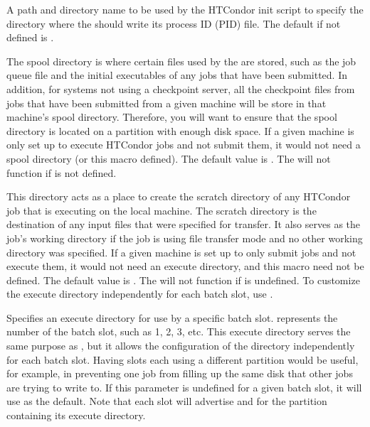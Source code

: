 \begin{description}
\label{param:Run}
\item[\Macro{RUN}]
  A path and directory name to be used by the HTCondor init script to 
  specify the directory where the  should write its process ID
  (PID) file. 
  The default if not defined is .
  
\label{param:Spool}
\item[\Macro{SPOOL}]
  The spool directory is where
  certain files used by the  are stored, such as the
  job queue file and the initial executables of any jobs that have
  been submitted.  In addition, for systems not using a checkpoint
  server, all the checkpoint files from jobs that have been submitted
  from a given machine will be store in that machine's spool
  directory.  Therefore, you will want to ensure that the spool
  directory is located on a partition with enough disk space.  If a
  given machine is only set up to execute HTCondor jobs and not submit
  them, it would not need a spool directory (or this macro defined).
  The default value is .
  The 
  will not function if  is not defined.
  
\label{param:Execute}
\item[\Macro{EXECUTE}]
  This directory acts as
  a place to create the scratch directory of any HTCondor job that is executing
  on
  the local machine.  The scratch directory is the destination of
  any input files that were specified for transfer.  It also serves
  as the job's working directory if the job is using file transfer
  mode and no other working directory was specified.
  If a given machine is set up to only submit
  jobs and not execute them, it would not need an execute directory,
  and this macro need not be defined.
  The default value is .
  The  will not function if
   is undefined.
  To customize the execute
  directory independently for each batch slot, use .

\label{param:SlotNExecute}
\item[\Macro{SLOT<N>\_EXECUTE}]
  Specifies an
  execute directory for use by a specific batch slot.
   represents the number of the batch slot, such as 1, 2, 3, etc.
  This execute directory serves the same purpose as , but it
  allows the configuration of the directory independently for each batch
  slot.  Having slots each using a different partition would be
  useful, for example, in preventing one job from filling up the same
  disk that other jobs are trying to write to.  If this parameter is
  undefined for a given batch slot, it will use  as
  the default.  Note that each slot will advertise 
  and  for the partition containing its execute
  directory.


\end{description}
